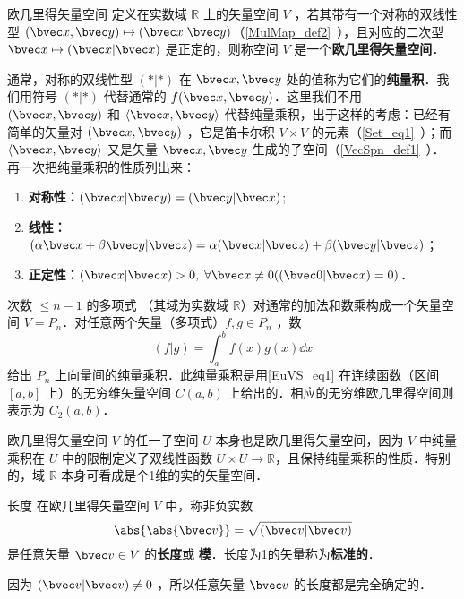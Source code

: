 
\begin{issues}
\issueMissDepend%
\end{issues}

\begin{definition}{欧几里得矢量空间}
定义在实数域 $\mathbb R$ 上的矢量空间 $V$ ，若其带有一个对称的双线性型 $(\bvec x,\bvec y)\mapsto(\bvec x|\bvec y)$（\autoref{MulMap_def2}~），且对应的二次型 $\bvec x\mapsto(\bvec x|\bvec x)$ 是正定的，则称空间 $V$ 是一个\textbf{欧几里得矢量空间}．
\end{definition}
通常，对称的双线性型 $(*|*)$ 在 $\bvec x,\bvec y$ 处的值称为它们的\textbf{纯量积}．我们用符号 $(*|*)$ 代替通常的 $f(\bvec x,\bvec y)$．这里我们不用 $(\bvec x,\bvec y)$ 和 $\langle\bvec x,\bvec y\rangle$ 代替纯量乘积，出于这样的考虑：已经有简单的矢量对 $(\bvec x,\bvec y)$ ，它是笛卡尔积 $V\times V$ 的元素（\autoref{Set_eq1}~）；而 $\langle \bvec x,\bvec y\rangle $ 又是矢量 $\bvec x,\bvec y$ 生成的子空间（\autoref{VecSpn_def1}~）．
再一次把纯量乘积的性质列出来：
\begin{enumerate}
\item \textbf{对称性：}$(\bvec x|\bvec y)=(\bvec y|\bvec x)$;
\item \textbf{线性：}$(\alpha\bvec x+\beta\bvec y|\bvec z)=\alpha(\bvec x|\bvec z)+\beta(\bvec y|\bvec z)$；
\item \textbf{正定性：}$(\bvec x|\bvec x)>0,\;\forall\bvec x\neq0((\bvec 0|\bvec x)=0)$．
\end{enumerate}
\begin{example}{}
次数 $\leq n-1$ 的多项式 （其域为实数域 $\mathbb R$）对通常的加法和数乘构成一个矢量空间 $V=P_n$．对任意两个矢量（多项式）$f,g\in P_n$ ，数 
\begin{equation}\label{EuVS_eq1}
(f|g)=\int_a^b f(x)g(x)\dd x
\end{equation}
给出 $P_n$ 上向量间的纯量乘积．此纯量乘积是用\autoref{EuVS_eq1} 在连续函数（区间 $[a,b]$ 上）的无穷维矢量空间 $C(a,b)$ 上给出的．相应的无穷维欧几里得空间则表示为 $C_2(a,b)$．
\end{example}
\begin{example}{}
欧几里得矢量空间 $V$ 的任一子空间 $U$ 本身也是欧几里得矢量空间，因为 $V$ 中纯量乘积在 $U$ 中的限制定义了双线性函数 $U\times U\rightarrow\mathbb R$，且保持纯量乘积的性质．特别的，域 $\mathbb R$ 本身可看成是个1维的实的矢量空间．
\end{example}
\begin{definition}{长度}
在欧几里得矢量空间 $V$ 中，称非负实数
\begin{equation}
\abs{\abs{\bvec v}}=\sqrt{(\bvec v|\bvec v)}
\end{equation}
是任意矢量 $\bvec v\in V$ 的\textbf{长度}或 \textbf{模}．长度为1的矢量称为\textbf{标准的}．
\end{definition}
因为 $(\bvec v|\bvec v)\neq0$ ，所以任意矢量 $\bvec v$ 的长度都是完全确定的．

